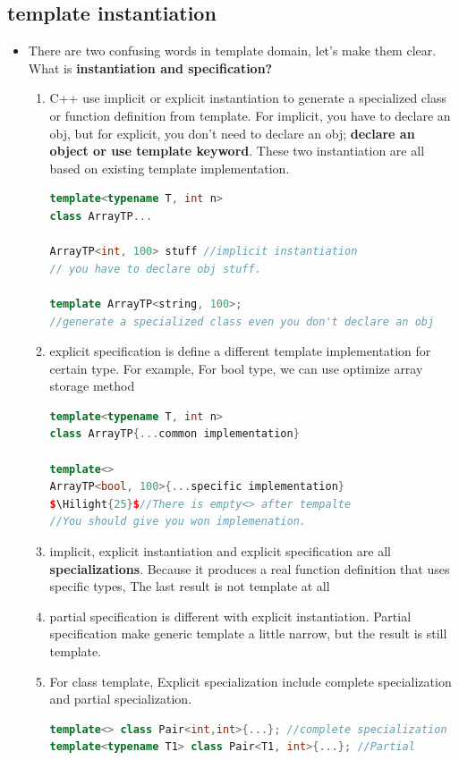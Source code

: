 \documentclass[a4paper,11pt,twoside]{book}
\newcommand{\Hilight}[1]{\makebox[0pt][l]{\color{yellow}\rule[-3pt]{#1em}{11pt}}}
\newcommand{\Hilight}[1]{}
\begin{document}
\subsection{template instantiation}
\begin{itemize}
\item There are two confusing words in template domain, let's make them clear. What is \textbf{instantiation and specification?}
\begin{enumerate}
	\item C++ use implicit or explicit instantiation to generate a specialized class or function definition from template. For implicit, you have to declare an obj, but for explicit, you don't need to declare an obj; \textbf{declare an object or use template keyword}. These two instantiation are all based on existing template implementation.
	
\begin{lstlisting}[frame=single, language=c++]
template<typename T, int n>
class ArrayTP...
	
ArrayTP<int, 100> stuff //implicit instantiation
// you have to declare obj stuff.
	
template ArrayTP<string, 100>;
//generate a specialized class even you don't declare an obj
\end{lstlisting}
	\item explicit specification is define a different template implementation for certain type. For example, For bool type, we can use optimize array storage method
\begin{lstlisting}[frame=single, language=c++]
template<typename T, int n>
class ArrayTP{...common implementation}
	
template<>
ArrayTP<bool, 100>{...specific implementation}
$\Hilight{25}$//There is empty<> after tempalte
//You should give you won implemenation.
	\end{lstlisting}
	
	\item implicit, explicit instantiation and explicit specification are all \textbf{specializations}. Because it produces a real function definition that uses specific types, The last result is not template at all 
	
	\item partial specification is different with explicit instantiation. Partial specification make generic template a little narrow, but the result is still template. 
	 
	\item For class template, Explicit specialization include complete specialization and partial specialization.
\begin{lstlisting}[frame=single, language=c++]
template<> class Pair<int,int>{...}; //complete specialization
template<typename T1> class Pair<T1, int>{...}; //Partial
\end{lstlisting}
	

\end{enumerate}
\end{itemize}
\end{document}
